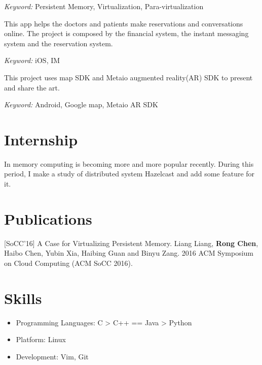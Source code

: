 \documentclass{resume}
\begin{document}
\textit{Keyword: } Persistent Memory, Virtualization, Para-virtualization



This app helps the doctors and patients make reservations and conversations online. 
The project is composed by the financial system, the instant messaging system and the reservation system.

\textit{Keyword: } iOS, IM

This project uses map SDK and Metaio augmented reality(AR) SDK to present and share the art. 

\textit{Keyword: } Android, Google map, Metaio AR SDK


\section{Internship}
In memory computing is becoming more and more popular recently. During this period, I make a study of distributed system Hazelcast and add some feature for it.

\section{Publications}
[SoCC'16] A Case for Virtualizing Persistent Memory. Liang Liang, \textbf{Rong Chen}, Haibo Chen, Yubin Xia, Haibing Guan and Binyu Zang. 2016 ACM Symposium on Cloud Computing (ACM SoCC 2016).


\section{Skills}
\begin{itemize}[parsep=0.5ex]
  \item Programming Languages: C > C++ == Java > Python
  \item Platform: Linux
  \item Development: Vim, Git
\end{itemize}
\end{document}
